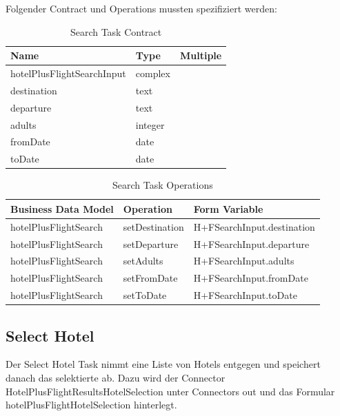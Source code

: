 Folgender Contract und Operations mussten spezifiziert werden:
\begin{table}[H] 
	\caption{Search Task Contract}
	\centering
	
	\begin{tabular}{ | l | l | c | } 
		\hline
		\textbf{Name} & \textbf{Type} & \textbf{Multiple} \\ \hline 
		hotelPlusFlightSearchInput & complex & \\ \hline
		\hspace*{5mm}destination & text & \\ \hline
		\hspace*{5mm}departure & text & \\ \hline
		\hspace*{5mm}adults & integer & \\ \hline
		\hspace*{5mm}fromDate & date & \\ \hline
		\hspace*{5mm}toDate & date & \\ \hline
	\end{tabular} 
\end{table}
\begin{table}[H] 
	\caption{Search Task Operations}
	\centering
	
	\begin{tabular}{ | l | l | l | } 
		\hline
		\textbf{Business Data Model} & \textbf{Operation} & \textbf{Form Variable} \\ \hline 
		hotelPlusFlightSearch & setDestination & H+FSearchInput.destination \\ \hline
		hotelPlusFlightSearch & setDeparture & H+FSearchInput.departure \\ \hline
		hotelPlusFlightSearch & setAdults & H+FSearchInput.adults \\ \hline
		hotelPlusFlightSearch & setFromDate & H+FSearchInput.fromDate \\ \hline
		hotelPlusFlightSearch & setToDate & H+FSearchInput.toDate \\ \hline
	\end{tabular} 
\end{table}

\subsection{Select Hotel}
Der Select Hotel Task nimmt eine Liste von Hotels entgegen und speichert danach das selektierte ab. Dazu wird der Connector HotelPlusFlightResultsHotelSelection unter Connectors out und das Formular hotelPlusFlightHotelSelection hinterlegt.

